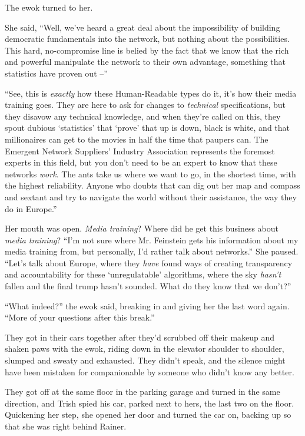 The ewok turned to her.

She said, “Well, we've heard a great deal about the impossibility of 
building democratic fundamentals into the network, but nothing about 
the possibilities. This hard, no-compromise line is belied by the fact 
that we know that the rich and powerful manipulate the network to their 
own advantage, something that statistics have proven out --”

“See, this is \emph{exactly} how these Human-Readable types do it, 
it's how their media training goes. They are here to ask for changes to 
\emph{technical} specifications, but they disavow any technical 
knowledge, and when they're called on this, they spout dubious 
`statistics' that `prove' that up is down, black is white, and that 
millionaires can get to the movies in half the time that paupers can. 
The Emergent Network Suppliers' Industry Association represents the 
foremost experts in this field, but you don't need to be an expert to 
know that these networks \emph{work}. The ants take us where we want to 
go, in the shortest time, with the highest reliability. Anyone who 
doubts that can dig out her map and compass and sextant and try to 
navigate the world without their assistance, the way they do in 
Europe.”

Her mouth was open. \emph{Media training}? Where did he get this 
business about \emph{media training}? “I'm not sure where Mr. 
Feinstein gets his information about my media training from, but 
personally, I'd rather talk about networks.” She paused. “Let's 
talk about Europe, where they \emph{have} found ways of creating 
transparency and accountability for these `unregulatable' algorithms, 
where the sky \emph{hasn't} fallen and the final trump hasn't sounded. 
What do they know that we don't?”

“What indeed?” the ewok said, breaking in and giving her the last 
word again. “More of your questions after this break.”

They got in their cars together after they'd scrubbed off their makeup 
and shaken paws with the ewok, riding down in the elevator shoulder to 
shoulder, slumped and sweaty and exhausted. They didn't speak, and the 
silence might have been mistaken for companionable by someone who 
didn't know any better.

They got off at the same floor in the parking garage and turned in the 
same direction, and Trish spied his car, parked next to hers, the last 
two on the floor. Quickening her step, she opened her door and turned 
the car on, backing up so that she was right behind Rainer.

